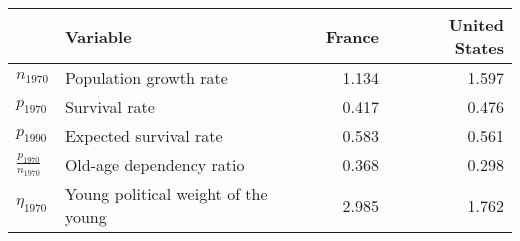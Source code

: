 
\begin{tabular}{llrr}
\toprule
\textbf{} & \textbf{Variable} & \textbf{France} & \textbf{United States}\\
\midrule
$n_{1970}$ & Population growth rate & 1.134 & 1.597\\
$p_{1970}$ & Survival rate & 0.417 & 0.476\\
$p_{1990}$ & Expected survival rate & 0.583 & 0.561\\
$\frac{p_{1970}}{n_{1970}}$ & Old-age dependency ratio & 0.368 & 0.298\\
$\eta_{1970}$ & Young political weight of the young & 2.985 & 1.762\\
\bottomrule
\end{tabular}
